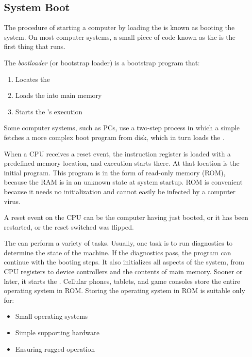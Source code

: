 \subsection{System Boot}\label{subsec:System_Boot}
The procedure of starting a computer by loading the  is known as booting the system.
On most computer systems, a small piece of code known as the  is the first thing that runs.

\begin{definition}[Bootloader]\label{def:Bootloader}
  The \emph{bootloader} (or bootstrap loader) is a bootstrap program that:
  \begin{enumerate}[noitemsep]
  \item Locates the 
  \item Loads the  into main memory
  \item Starts the 's execution
  \end{enumerate}
\end{definition}

Some computer systems, such as PCs, use a two-step process in which a simple  fetches a more complex boot program from disk, which in turn loads the .

When a CPU receives a reset event, the instruction register is loaded with a predefined memory location, and execution starts there.
At that location is the initial  program.
This program is in the form of read-only memory (ROM), because the RAM is in an unknown state at system startup.
ROM is convenient because it needs no initialization and cannot easily be infected by a computer virus.

\begin{remark*}
  A reset event on the CPU can be the computer having just booted, or it has been restarted, or the reset switched was flipped.
\end{remark*}

The  can perform a variety of tasks.
Usually, one task is to run diagnostics to determine the state of the machine.
If the diagnostics pass, the program can continue with the booting steps.
It also initializes all aspects of the system, from CPU registers to device controllers and the contents of main memory.
Sooner or later, it starts the .
Cellular phones, tablets, and game consoles store the entire operating system in ROM.\@
Storing the operating system in ROM is suitable only for:
\begin{itemize}[noitemsep]
\item Small operating systems
\item Simple supporting hardware
\item Ensuring rugged operation
\end{itemize}


